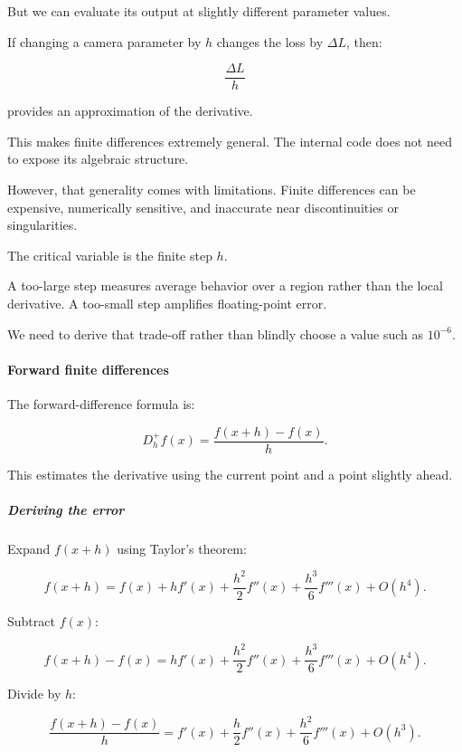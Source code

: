 But we can evaluate its output at slightly different parameter values.

If changing a camera parameter by \(h\) changes the loss by \(\Delta L\), then:

\[
\frac{\Delta L}{h}
\]

provides an approximation of the derivative.

This makes finite differences extremely general. The internal code does not need to expose its algebraic structure.

However, that generality comes with limitations. Finite differences can be expensive, numerically sensitive, and inaccurate near discontinuities or singularities.

The critical variable is the finite step \(h\).

A too-large step measures average behavior over a region rather than the local derivative. A too-small step amplifies floating-point error.

We need to derive that trade-off rather than blindly choose a value such as \(10^{-6}\).

\paragraph{Forward finite differences}\label{02-foundations-ii-ch025-forward-finite-differences}

\hypertarget{02-foundations-ii-ch025-forward-finite-differences}{}

The forward-difference formula is:

\[
\boxed{ D_h^+f(x)=\frac{f(x+h)-f(x)}h }.
\]

This estimates the derivative using the current point and a point slightly ahead.

\subparagraph{Deriving the error}\label{02-foundations-ii-ch025-deriving-the-error}

\hypertarget{02-foundations-ii-ch025-deriving-the-error}{}

Expand \(f(x+h)\) using Taylor's theorem:

\[
f(x+h) = f(x)+hf'(x)+ \frac{h^2}{2}f''(x)+ \frac{h^3}{6}f'''(x)+O(h^4).
\]

Subtract \(f(x)\):

\[
f(x+h)-f(x) = hf'(x)+ \frac{h^2}{2}f''(x)+ \frac{h^3}{6}f'''(x)+O(h^4).
\]

Divide by \(h\):

\[
\frac{f(x+h)-f(x)}h = f'(x)+ \frac h2f''(x)+ \frac{h^2}{6}f'''(x)+O(h^3).
\]

